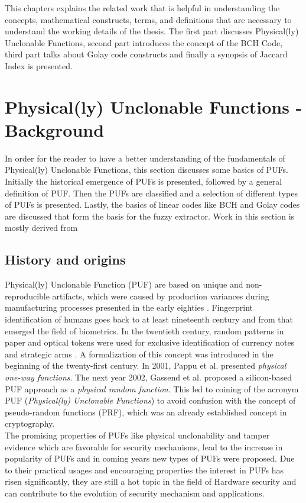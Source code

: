 This chapters explains the related work that is helpful in understanding the concepts, mathematical constructs, terms, and definitions that are necessary to understand the working details of the thesis. The first part discusses Physical(ly) Unclonable Functions, second part introduces the concept of the BCH Code, third part talks about Golay code constructs and finally a synopsis of Jaccard Index is presented.

\section{Physical(ly) Unclonable Functions - Background}
In order for the reader to have a better understanding of the fundamentals of Physical(ly) Unclonable Functions, this section discusses some basics of PUFs. Initially the historical emergence of PUFs is presented, followed by a general definition of PUF. Then the PUFs are classified and a selection of different types of PUFs is presented. Lastly, the basics of linear codes like BCH and Golay codes are discussed that form the basis for the fuzzy extractor. Work in this section is mostly derived
from \cite{17,18}\\

\subsection{History and origins}
Physical(ly) Unclonable Function (PUF) are based on unique and non-reproducible artifacts, which were caused by production variances during manufacturing processes presented in the early eighties \cite{16}. Fingerprint identification of humans goes back to at least nineteenth century \cite{th21} and from that emerged the field of biometrics. In the twentieth century, random patterns in paper and optical tokens were used for exclusive identification of currency notes and strategic arms \cite{2,8,53}. A
formalization of this concept was introduced in the beginning of the twenty-first century. In 2001, Pappu et al. \cite{19,39} presented \emph{physical one-way functions}. The next year 2002, Gassend et al. \cite{21} proposed a silicon-based PUF approach as a \emph{physical random function}. This led to coining of the acronym PUF (\emph{Physical(ly) Unclonable Functions}) to avoid confusion with the concept of pseudo-random functions (PRF), which was an already established concept in cryptography.\\

The promising properties of PUFs like physical unclonability and tamper evidence which are favorable for security mechanisms, lead to the increase in popularity of PUFs and in coming years new types of PUFs were proposed. Due to their practical usages and encouraging properties the interest in PUFs has risen significantly, they are still a hot topic in the field of Hardware security and can contribute to the evolution of security mechanism and applications.\\

